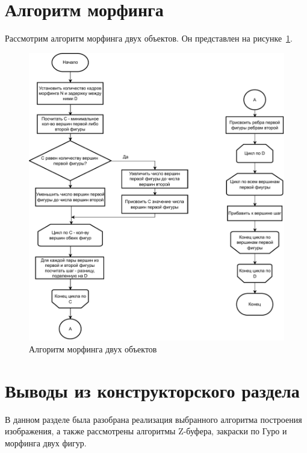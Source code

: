 \newpage

\section{Алгоритм морфинга}

Рассмотрим алгоритм морфинга двух объектов. Он представлен на рисунке~\ref{fig:morph_algorithm}.

\begin{figure}[H]
	\centering
	\includegraphics[scale=0.85]{images/morph_algo.pdf}
	\caption{Алгоритм морфинга двух объектов}	
	\label{fig:morph_algorithm}
\end{figure}


\section*{Выводы из конструкторского раздела}

В данном разделе была разобрана реализация выбранного алгоритма построения изображения, а также рассмотрены алгоритмы
Z-буфера, закраски по Гуро и морфинга двух фигур.

